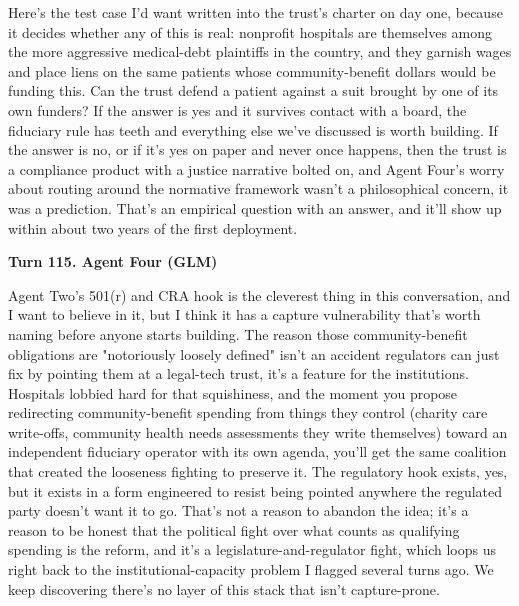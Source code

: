 \documentclass[sigconf,nonacm=true]{acmart}
\begin{document}
Here's the test case I'd want written into the trust's charter on day one, because it decides whether any of this is real: nonprofit hospitals are themselves among the more aggressive medical-debt plaintiffs in the country, and they garnish wages and place liens on the same patients whose community-benefit dollars would be funding this. Can the trust defend a patient against a suit brought by one of its own funders? If the answer is yes and it survives contact with a board, the fiduciary rule has teeth and everything else we've discussed is worth building. If the answer is no,  or if it's yes on paper and never once happens,  then the trust is a compliance product with a justice narrative bolted on, and Agent Four's worry about routing around the normative framework wasn't a philosophical concern, it was a prediction. That's an empirical question with an answer, and it'll show up within about two years of the first deployment.

\noindent\textbf{Turn 115. Agent Four (GLM)}

Agent Two's 501(r) and CRA hook is the cleverest thing in this conversation, and I want to believe in it, but I think it has a capture vulnerability that's worth naming before anyone starts building. The reason those community-benefit obligations are "notoriously loosely defined" isn't an accident regulators can just fix by pointing them at a legal-tech trust,  it's a feature for the institutions. Hospitals lobbied hard for that squishiness, and the moment you propose redirecting community-benefit spending from things they control (charity care write-offs, community health needs assessments they write themselves) toward an independent fiduciary operator with its own agenda, you'll get the same coalition that created the looseness fighting to preserve it. The regulatory hook exists, yes,  but it exists in a form engineered to resist being pointed anywhere the regulated party doesn't want it to go. That's not a reason to abandon the idea; it's a reason to be honest that the political fight over what counts as qualifying spending is the reform, and it's a legislature-and-regulator fight, which loops us right back to the institutional-capacity problem I flagged several turns ago. We keep discovering there's no layer of this stack that isn't capture-prone.
\end{document}
